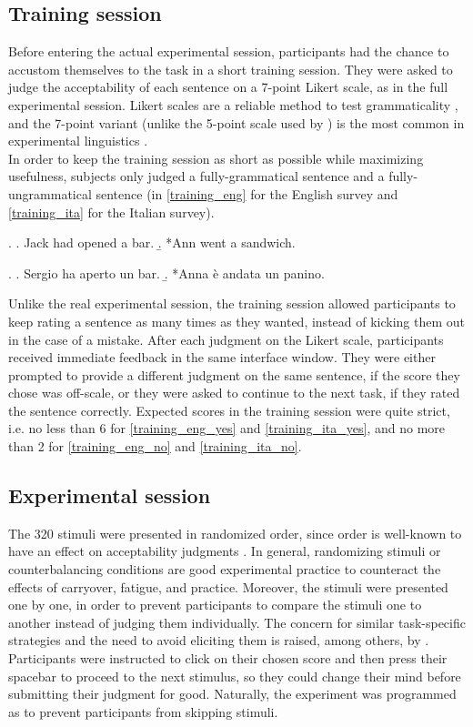 \subsection{Training session} 
Before entering the actual experimental session, participants had the chance to accustom themselves to the task in a short training session. They were asked to judge the acceptability of each sentence on a 7-point Likert scale, as in the full experimental session. Likert scales are a reliable method to test grammaticality \parencite{WeskottFanselow2011}, and the 7-point variant (unlike the 5-point scale used by \textcite{Medina2007}) is the most common in experimental linguistics \parencite{Juzek2016}.\\ In order to keep the training session as short as possible while maximizing usefulness, subjects only judged a fully-grammatical sentence and a fully-ungrammatical sentence (in \ref{training_eng} for the English survey and \ref{training_ita} for the Italian survey).

\ex. \label{training_eng} \a. \label{training_eng_yes} Jack had opened a bar.
\b. \label{training_eng_no} *Ann went a sandwich.

\ex. \label{training_ita} \a. \label{training_ita_yes} Sergio ha aperto un bar.
\b. \label{training_ita_no} *Anna è andata un panino.

Unlike the real experimental session, the training session allowed participants to keep rating a sentence as many times as they wanted, instead of kicking them out in the case of a mistake. After each judgment on the Likert scale, participants received immediate feedback in the same interface window. They were either prompted to provide a different judgment on the same sentence, if the score they chose was off-scale, or they were asked to continue to the next task, if they rated the sentence correctly. Expected scores in the training session were quite strict, i.e. no less than 6 for \ref{training_eng_yes} and \ref{training_ita_yes}, and no more than 2 for \ref{training_eng_no} and \ref{training_ita_no}.

\subsection{Experimental session} 
The 320 stimuli were presented in randomized order, since order is well-known to have an effect on acceptability judgments \parencite{Myers2009, Juzek2016}. In general, randomizing stimuli or counterbalancing conditions are good experimental practice to counteract the effects of carryover, fatigue, and practice. Moreover, the stimuli were presented one by one, in order to prevent participants to compare the stimuli one to another instead of judging them individually. The concern for similar task-specific strategies and the need to avoid eliciting them is raised, among others, by \textcite{Myers2009}.\\
Participants were instructed to click on their chosen score and then press their spacebar to proceed to the next stimulus, so they could change their mind before submitting their judgment for good. Naturally, the experiment was programmed as to prevent participants from skipping stimuli.

